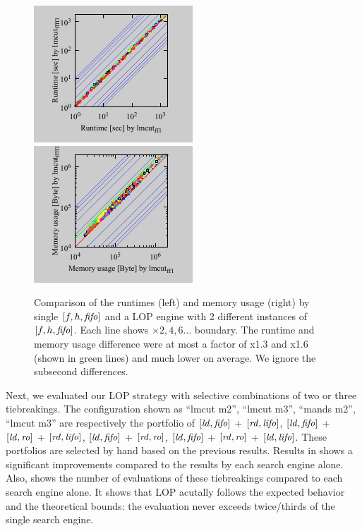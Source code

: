\begin{figure}[tb]
 \centering {}
 \includegraphics{tables/aaai16-30min/aaai16prelim3/time-nokey-lmcut_ff-lmcut_ffff.pdf}
 \includegraphics{tables/aaai16-30min/aaai16prelim3/mem-nokey-lmcut_ff-lmcut_ffff.pdf}
 \caption{Comparison of the runtimes (left) and memory usage (right) by
 single $[f,h,\mbox{\textit{fifo}}]$ and a LOP engine with 2 different instances of
 $[f,h,\mbox{\textit{fifo}}]$. Each line shows $\times 2,4,6\ldots$ boundary.
 The runtime and memory usage difference were at most a factor of x1.3
 and x1.6 (shown in green lines) and much lower on average. We
 ignore the subsecond differences.}  \label{ffff}
\end{figure}

Next, we evaluated our LOP
strategy with selective combinations of two or three tiebreakings.
The configuration shown as ``lmcut m2'', ``lmcut m3'', ``mands m2'',
``lmcut m3'' are respectively the portfolio of
$[\mbox{\textit{ld}},\mbox{\textit{fifo}}]$ + $[\mbox{\textit{rd}},\mbox{\textit{lifo}}]$, $[\mbox{\textit{ld}},\mbox{\textit{fifo}}]$ + $[\mbox{\textit{ld}},\mbox{\textit{ro}}]$ + $[\mbox{\textit{rd}},\mbox{\textit{lifo}}]$,
$[\mbox{\textit{ld}},\mbox{\textit{fifo}}]$ + $[\mbox{\textit{rd}},\mbox{\textit{ro}}]$, $[\mbox{\textit{ld}},\mbox{\textit{fifo}}]$ + $[\mbox{\textit{rd}},\mbox{\textit{ro}}]$ + $[\mbox{\textit{ld}},\mbox{\textit{lifo}}]$. These
portfolios are selected by hand based on the previous results.
Results in 
shows a significant improvements compared to the results by each search
engine alone.
% 
Also,  shows the number of evaluations of these
tiebreakings compared to each search engine alone.  It shows that
LOP acutally follows the expected behavior and the theoretical
bounds: the evaluation never exceeds twice/thirds of the single
search engine.

